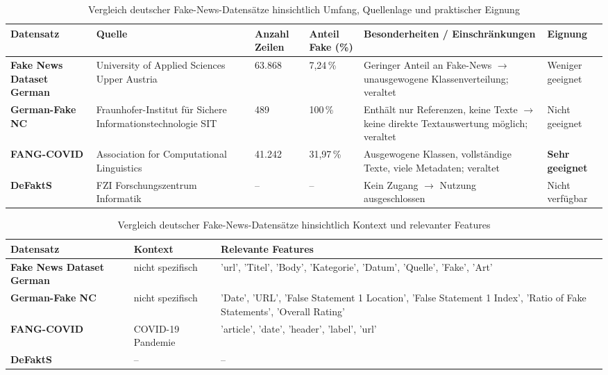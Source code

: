 \begin{table}[ht]
    \centering
    \renewcommand{\arraystretch}{1.3}
    \begin{tabular}{|p{1.9cm}|p{2.3cm}|p{1.3cm}|p{1.3cm}|p{3.3cm}|p{1.5cm}|}
        \hline
        \rowcolor{lightgray} \textbf{Datensatz} & \textbf{Quelle} & \textbf{Anzahl Zeilen} & \textbf{Anteil Fake (\%)} & \textbf{Besonderheiten / Einschränkungen} & \textbf{Eignung} \\
        \hline
        \textbf{Fake News Dataset German} & University of Applied Sciences Upper Austria & 63.868 & 7{,}24\,\% & Geringer Anteil an Fake-News $\rightarrow$ unausgewogene Klassenverteilung; veraltet & Weniger geeignet \\
        \hline
        \textbf{German-Fake NC} & Fraunhofer-Institut für Sichere Informationstechnologie SIT & 489 & 100\,\% & Enthält nur Referenzen, keine Texte $\rightarrow$ keine direkte Textauswertung möglich; veraltet & Nicht geeignet \\
        \hline
        \textbf{FANG-COVID} & Association for Computational Linguistics & 41.242 & 31{,}97\,\% & Ausgewogene Klassen, vollständige Texte, viele Metadaten; veraltet & \textbf{Sehr geeignet} \\
        \hline
        \textbf{DeFaktS} & FZI Forschungszentrum Informatik & -- & -- & Kein Zugang $\rightarrow$ Nutzung ausgeschlossen & Nicht verfügbar \\
        \hline
    \end{tabular}
    \caption{Vergleich deutscher Fake-News-Datensätze hinsichtlich Umfang, Quellenlage und praktischer Eignung}
    \label{tab:deutsche-fake-news-datensaetze}
\end{table}

\begin{table}[ht]
    \centering
    \renewcommand{\arraystretch}{1.3}
    \begin{tabular}{|p{3cm}|p{2cm}|p{8cm}|}
        \hline
        \rowcolor{lightgray} \textbf{Datensatz} & \textbf{Kontext} & \textbf{Relevante Features} \\
        \hline
        \textbf{Fake News Dataset German} & nicht spezifisch & 'url', 'Titel', 'Body', 'Kategorie', 'Datum', 'Quelle', 'Fake', 'Art' \\
        \hline
        \textbf{German-Fake NC} & nicht spezifisch & 'Date', 'URL', 'False Statement 1 Location', 'False Statement 1 Index', 'Ratio of Fake Statements', 'Overall Rating' \\
        \hline
        \textbf{FANG-COVID} & COVID-19 Pandemie & 'article', 'date', 'header', 'label', 'url' \\
        \hline
        \textbf{DeFaktS} & -- &  -- \\
        \hline
    \end{tabular}
    \caption{Vergleich deutscher Fake-News-Datensätze hinsichtlich Kontext und relevanter Features}
    \label{tab:deutsche-fake-news-datensaetze-inhalt}
\end{table}

